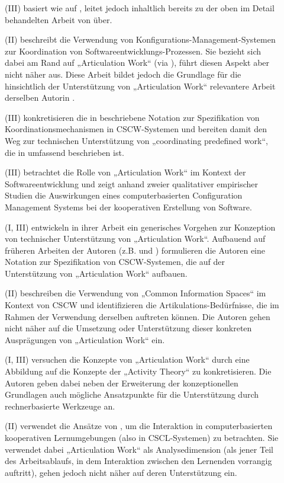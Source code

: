 \begin{description}
	\item[\citet{Schmidt95}] (III) basiert wie \citep{Schmidt94} auf \citep{Schmidt90}, leitet jedoch inhaltlich bereits zu der oben im Detail behandelten Arbeit von \citet{Schmidt96} über.
	\item[\citet{Grinter95}] (II) beschreibt die Verwendung von Konfigurations-Management-Systemen zur Koordination von Softwareentwicklungs-Prozessen. Sie bezieht sich dabei am Rand auf „Articulation Work“ (via \citep{Schmidt92}), führt diesen Aspekt aber nicht näher aus. Diese Arbeit bildet jedoch die Grundlage für die hinsichtlich der Unterstützung von „Articulation Work“ relevantere Arbeit derselben Autorin \citep{Grinter96}.
	\item[\citet{Simone95}] (III) konkretisieren die in \citet{Schmidt96} beschriebene Notation zur Spezifikation von Koordinationsmechanismen in \gls{CSCW}-Systemen und bereiten damit den Weg zur technischen Unterstützung von „coordinating predefined work“, die in \citep{Divitini00} umfassend beschrieben ist.
	\item[\citet{Grinter96}] (III) betrachtet die Rolle von „Articulation Work“ im Kontext der Softwareentwicklung und zeigt anhand zweier qualitativer empirischer Studien die Auswirkungen eines computerbasierten Configuration Management Systems bei der kooperativen Erstellung von Software.
	\item[\citet{Schmidt96}] (I, III) entwickeln in ihrer Arbeit ein generisches Vorgehen zur Konzeption von technischer Unterstützung von „Articulation Work“. Aufbauend auf früheren Arbeiten der Autoren (z.B. \citep{Schmidt90} und \citep{Schmidt92}) formulieren die Autoren eine Notation zur Spezifikation von \gls{CSCW}-Systemen, die auf der Unterstützung von „Articulation Work“ aufbauen.
	\item[\citet{Bannon97}] (II) beschreiben die Verwendung von „Common Information Spaces“ im Kontext von \gls{CSCW} und identifizieren die Artikulations-Bedürfnisse, die im Rahmen der Verwendung derselben auftreten können. Die Autoren gehen nicht näher auf die Umsetzung oder Unterstützung dieser konkreten Ausprägungen von „Articulation Work“ ein.
	\item[\citet{Fjuk97}] (I, III) versuchen die Konzepte von „Articulation Work“ durch eine Abbildung auf die Konzepte der „Activity Theory“ zu konkretisieren. Die Autoren geben dabei neben der Erweiterung der konzeptionellen Grundlagen auch mögliche Ansatzpunkte für die Unterstützung durch rechnerbasierte Werkzeuge an.
	\item[\citet{Fjuk97a}] (II) verwendet die Ansätze von \citet{Strauss93}, um die Interaktion in computerbasierten kooperativen Lernumgebungen (also in \gls{CSCL}-Systemen) zu betrachten. Sie verwendet dabei „Articulation Work“ als Analysedimension (als jener Teil des Arbeitsablaufs, in dem Interaktion zwischen den Lernenden vorrangig auftritt), gehen jedoch nicht näher auf deren Unterstützung ein.

\end{description}
